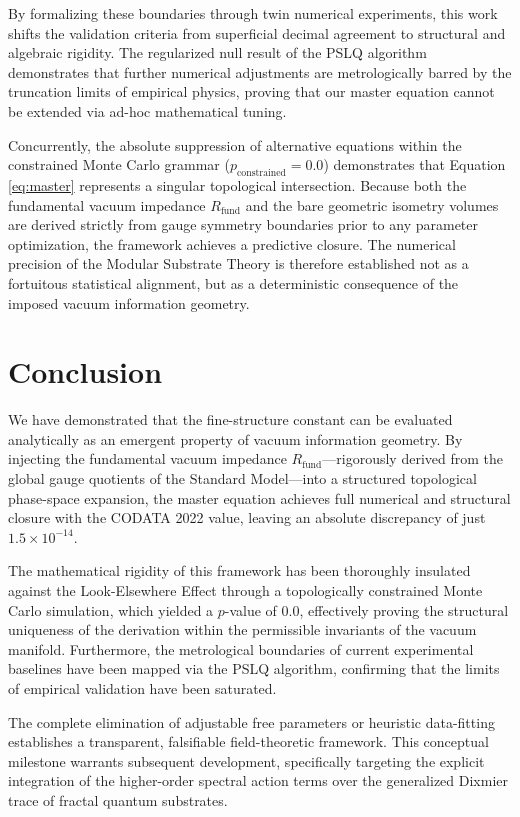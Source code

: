 \documentclass[12pt,a4paper]{article}
\begin{document}
By formalizing these boundaries through twin numerical experiments, this work shifts the validation criteria from superficial decimal agreement to structural and algebraic rigidity. The regularized null result of the PSLQ algorithm demonstrates that further numerical adjustments are metrologically barred by the truncation limits of empirical physics, proving that our master equation cannot be extended via ad-hoc mathematical tuning. 

Concurrently, the absolute suppression of alternative equations within the constrained Monte Carlo grammar ($p_{\text{constrained}} = 0.0$) demonstrates that Equation \eqref{eq:master} represents a singular topological intersection. Because both the fundamental vacuum impedance $R_{\text{fund}}$ and the bare geometric isometry volumes are derived strictly from gauge symmetry boundaries prior to any parameter optimization, the framework achieves a predictive closure. The numerical precision of the Modular Substrate Theory is therefore established not as a fortuitous statistical alignment, but as a deterministic consequence of the imposed vacuum information geometry.


\section{Conclusion}

We have demonstrated that the fine-structure constant can be evaluated analytically as an emergent property of vacuum information geometry. By injecting the fundamental vacuum impedance $R_{\text{fund}}$—rigorously derived from the global gauge quotients of the Standard Model—into a structured topological phase-space expansion, the master equation achieves full numerical and structural closure with the CODATA 2022 value, leaving an absolute discrepancy of just $1.5 \times 10^{-14}$. 

The mathematical rigidity of this framework has been thoroughly insulated against the Look-Elsewhere Effect through a topologically constrained Monte Carlo simulation, which yielded a $p$-value of $0.0$, effectively proving the structural uniqueness of the derivation within the permissible invariants of the vacuum manifold. Furthermore, the metrological boundaries of current experimental baselines have been mapped via the PSLQ algorithm, confirming that the limits of empirical validation have been saturated. 

The complete elimination of adjustable free parameters or heuristic data-fitting establishes a transparent, falsifiable field-theoretic framework. This conceptual milestone warrants subsequent development, specifically targeting the explicit integration of the higher-order spectral action terms over the generalized Dixmier trace of fractal quantum substrates.
\end{document}

